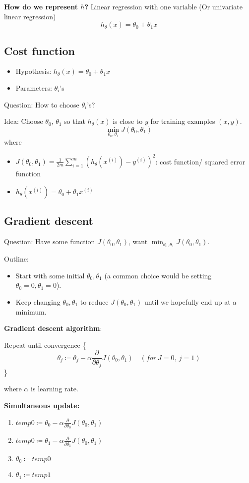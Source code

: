 

\textbf{How do we represent $h$?} Linear regression with one variable (Or univariate linear regression)
$$h_{\theta}(x)=\theta_0+\theta_1 x$$



\subsection{Cost function}

\begin{itemize}
  \item Hypothesis: $h_{\theta}(x)=\theta_0+\theta_1 x$
  \item Parameters: $\theta_i$'s
\end{itemize}

Question: How to choose $\theta_i$'s?

Idea: Choose $\theta_0$, $\theta_1$ so that $h_{\theta}(x)$ is close to $y$ for training examples $(x,y)$.
$$\min_{\theta_0, \theta_1} J(\theta_0, \theta_1)$$
where
\begin{itemize}
  \item $J(\theta_0, \theta_1)=\frac{1}{2m}\sum^m_{i=1}(h_\theta(x^{(i)})-y^{(i)})^2$: cost function/ squared error function
  \item $h_{\theta}(x^{(i)})=\theta_0+\theta_1 x^{(i)}$
\end{itemize}

\subsection{Gradient descent}

Question: Have some function $J(\theta_0, \theta_1)$, want $\min_{\theta_0, \theta_1} J(\theta_0, \theta_1)$.

Outline:
\begin{itemize}
  \item Start with some initial $\theta_0, \theta_1$ (a common choice would be setting $\theta_0=0, \theta_1=0$).
  \item Keep changing $\theta_0, \theta_1$ to reduce $J(\theta_0, \theta_1)$ until we hopefully end up at a minimum.
\end{itemize}

\textbf{Gradient descent algorithm}:

Repeat until convergence \{
$$\theta_j\coloneqq\theta_j-\alpha\frac{\partial}{\partial \theta_j}J(\theta_0,\theta_1)\quad (for\ J=0,\  j=1)$$
\}

where $\alpha$ is learning rate.

\textbf{Simultaneous update:}
\begin{enumerate}
  \item $temp0\coloneqq\theta_0-\alpha\frac{\partial}{\partial \theta_0}J(\theta_0,\theta_1)$
  \item $temp0\coloneqq\theta_1-\alpha\frac{\partial}{\partial \theta_1}J(\theta_0,\theta_1)$
  \item $\theta_0\coloneqq temp0$
  \item $\theta_1\coloneqq temp1$
\end{enumerate}

